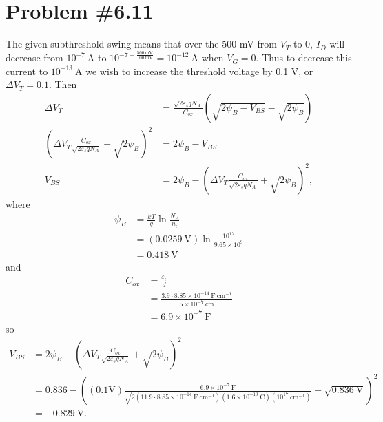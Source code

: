 \documentclass{article}
\begin{document}
\section*{Problem \#6.11}
The given subthreshold swing means that over the 500 mV from $V_T$ to $0$, $I_D$ will
decrease from $10^{-7} ~\mathrm{A}$ to 
$10^{-7 - \frac{500 ~\mathrm{mV}}{100 ~\mathrm{mV}}} = 10^{-12} ~\mathrm{A}$ when 
$V_G = 0$. Thus to decrease this current to $10^{-13} ~\mathrm{A}$ we wish to increase
the threshold voltage by 0.1 V, or $\Delta V_T = 0.1.$ Then
\begin{align*}
\Delta V_T &= \frac{\sqrt{2 \varepsilon_s q N_A}}{C_{ox}}
              (\sqrt{2 \psi_B - V_{BS}} - \sqrt{2 \psi_B}) \\
\left(\Delta V_T \frac{C_{ox}}{\sqrt{2 \varepsilon_s q N_A}} + \sqrt{2 \psi_B}\right)^2 
  &= 2 \psi_B - V_{BS} \\
V_{BS} &= 2 \psi_B 
        - \left(\Delta V_T \frac{C_{ox}}{\sqrt{2 \varepsilon_s q N_A}} + \sqrt{2 \psi_B}\right)^2,
\end{align*}
where
\begin{align*}
\psi_B &= \frac{kT}{q} \ln \frac{N_A}{n_i} \\
       &= (0.0259 ~\mathrm{V}) \ln \frac{10^{17}}{9.65 \times 10^{9}} \\
       &= 0.418 ~\mathrm{V}
\end{align*}
and
\begin{align*}
C_{ox} &= \frac{\varepsilon_i}{d} \\
       &= \frac{3.9 \cdot 8.85 \times 10^{-14} ~\mathrm{F}~\mathrm{cm}^{-1}}
               {5 \times 10^{-7} ~\mathrm{cm}} \\
       &= 6.9 \times 10^{-7} ~\mathrm{F}
\end{align*}
so
\begin{align*}
V_{BS} &= 2 \psi_B 
        - \left(\Delta V_T \frac{C_{ox}}{\sqrt{2 \varepsilon_s q N_A}} + \sqrt{2 \psi_B}\right)^2 \\
       &= 0.836
        - \left((0.1 \mathrm{V})\frac{6.9 \times 10^{-7} ~\mathrm{F}}
                                     {\sqrt{2(11.9 \cdot 8.85 \times 10^{-14} ~\mathrm{F}~\mathrm{cm}^{-1})
                                             (1.6 \times 10^{-19} ~\mathrm{C})
                                             (10^{17} ~\mathrm{cm}^{-1})}} 
                                    + \sqrt{0.836 ~\mathrm{V}}\right)^2 \\
       &= -0.829 ~\mathrm{V}.
\end{align*} 
\end{document}
